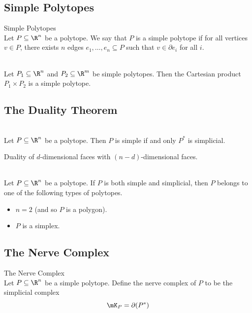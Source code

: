 \documentclass[a4paper]{article}
\begin{document}
\subsection{Simple Polytopes}
\begin{defn}{Simple Polytopes}{}\\
Let $P\subseteq\R^n$ be a polytope. We say that $P$ is a simple polytope if for all vertices $v\in P$, there exists $n$ edges $e_1,\dots,e_n\subseteq P$ such that $v\in\partial e_i$ for all $i$. 
\end{defn}

\begin{lmm}{}{}\\
Let $P_1\subseteq\R^n$ and $P_2\subseteq\R^m$ be simple polytopes. Then the Cartesian product $P_1\times P_2$ is a simple polytope. 
\end{lmm}

\subsection{The Duality Theorem}
\begin{prp}{}{}\\
Let $P\subseteq\R^n$ be a polytope. Then $P$ is simple if and only $P^\ast$ is simplicial. 
\end{prp}

Duality of $d$-dimensional faces with $(n-d)$-dimensional faces. 

\begin{prp}{}{}\\
Let $P\subseteq\R^n$ be a polytope. If $P$ is both simple and simplicial, then $P$ belongs to one of the following types of polytopes. 
\begin{itemize}
\item $n=2$ (and so $P$ is a polygon). 
\item $P$ is a simplex. 
\end{itemize}
\end{prp}

\subsection{The Nerve Complex}
\begin{defn}{The Nerve Complex}{}\\
Let $P\subseteq\R^n$ be a simple polytope. Define the nerve complex of $P$ to be the simplicial complex $$\mK_P=\partial(P^\ast)$$
\end{defn}
\end{document}
